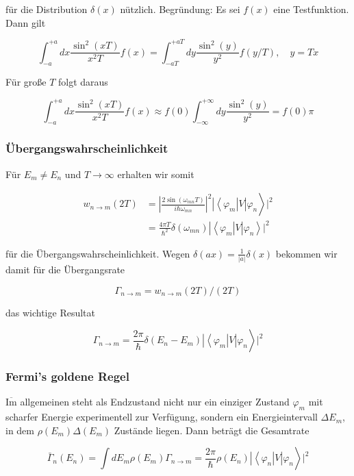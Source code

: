 \documentclass[10pt, letterpaper]{article}
\begin{document}
für die Distribution $\delta(x)$ nützlich. Begründung: Es sei $f(x)$ eine Testfunktion. Dann gilt

$$
\int_{-a}^{+a} d x \frac{\sin ^{2}(x T)}{x^{2} T} f(x)=\int_{-a T}^{+a T} d y \frac{\sin ^{2}(y)}{y^{2}} f(y / T), \quad y=T x
$$

Für große $T$ folgt daraus

$$
\int_{-a}^{+a} d x \frac{\sin ^{2}(x T)}{x^{2} T} f(x) \approx f(0) \int_{-\infty}^{+\infty} d y \frac{\sin ^{2}(y)}{y^{2}}=f(0) \pi
$$

\subsubsection*{Übergangswahrscheinlichkeit}
Für $E_{m} \neq E_{n}$ und $T \rightarrow \infty$ erhalten wir somit

$$
\begin{aligned}
w_{n \rightarrow m}(2 T) & \left.=\left|\frac{2 \sin \left(\omega_{m n} T\right)}{i \hbar \omega_{m n}}\right|^{2}\left|\left\langle\varphi_{m}\right| V\right| \varphi_{n}\right\rangle\left.\right|^{2} \\
& \left.=\frac{4 \pi T}{\hbar^{2}} \delta\left(\omega_{m n}\right)\left|\left\langle\varphi_{m}\right| V\right| \varphi_{n}\right\rangle\left.\right|^{2}
\end{aligned}
$$

für die Übergangswahrscheinlichkeit. Wegen $\delta(a x)=\frac{1}{|a|} \delta(x)$ bekommen wir damit für die Übergangsrate

$$
\Gamma_{n \rightarrow m}=w_{n \rightarrow m}(2 T) /(2 T)
$$

das wichtige Resultat

$$
\left.\Gamma_{n \rightarrow m}=\frac{2 \pi}{\hbar} \delta\left(E_{n}-E_{m}\right)\left|\left\langle\varphi_{m}\right| V\right| \varphi_{n}\right\rangle\left.\right|^{2}
$$

\subsubsection*{Fermi's goldene Regel}
$\overline{\mathrm{Im}}$ allgemeinen steht als Endzustand nicht nur ein einziger Zustand $\varphi_{m}$ mit scharfer Energie experimentell zur Verfügung, sondern ein Energieintervall $\Delta E_{m}$, in dem $\rho\left(E_{m}\right) \Delta\left(E_{m}\right)$ Zustände liegen. Dann beträgt die Gesamtrate

$$
\left.\bar{\Gamma}_{n}\left(E_{n}\right)=\int d E_{m} \rho\left(E_{m}\right) \Gamma_{n \rightarrow m}=\frac{2 \pi}{\hbar} \rho\left(E_{n}\right)\left|\left\langle\varphi_{n}\right| V\right| \varphi_{n}\right\rangle\left.\right|^{2}
$$
\end{document}
